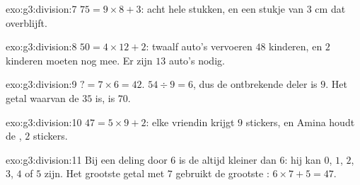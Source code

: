 \begin{solution}{exo:g3:division:7}
$75 = 9 \times 8 + 3$: acht hele stukken, en een stukje van $3$ cm dat
overblijft.
\end{solution}

\begin{solution}{exo:g3:division:8}
$50 = 4 \times 12 + 2$: twaalf auto's vervoeren $48$ kinderen, en $2$
kinderen moeten nog mee. Er zijn $13$ auto's nodig.
\end{solution}

\begin{solution}{exo:g3:division:9}
$? = 7 \times 6 = 42$. \quad
$54 \div 9 = 6$, dus de ontbrekende deler is $9$. \quad
Het getal waarvan de  $35$ is, is $70$.
\end{solution}

\begin{solution}{exo:g3:division:10}
$47 = 5 \times 9 + 2$: elke vriendin krijgt $9$ stickers, en Amina houdt
de , $2$ stickers.
\end{solution}

\begin{solution}{exo:g3:division:11}
Bij een deling door $6$ is de  altijd kleiner dan $6$: hij kan $0$,
$1$, $2$, $3$, $4$ of $5$ zijn. Het grootste getal met  $7$
gebruikt de grootste : $6 \times 7 + 5 = 47$.
\end{solution}
